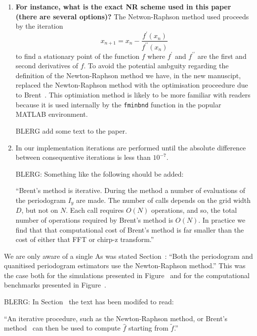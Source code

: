 \documentclass[a4paper,10pt]{article}
\begin{document}
\begin{enumerate}
\begin{enumerate}
\item \textbf{For instance, what is the exact NR scheme used in this paper (there are several options)?}  The Netwon-Raphson method used proceeds by the iteration
\[
x_{n+1} = x_n - \frac{f^\prime(x_{n})}{f^{\prime\prime}(x_n)}
\]
to find a stationary point of the function $f$ where $f^\prime$ and $f^{\prime\prime}$ are the first and second derivatives of $f$.  To avoid the potential ambguity regarding the definition of the Newton-Raphson method we have, in the new manuscipt, replaced the Newton-Raphson method with the optimisation proceedure due to Brent~\cite[Ch.~5]{Brent_opt_no_derivs_1973}.  This optimiation method is likely to be more familiar with readers because it is used internally by the \texttt{fminbnd} function in the popular MATLAB environment. 

BLERG add some text to the paper.

\item {} In our implementation iterations are performed until the absolute difference between consequentive iterations is less than $10^{-7}$.

BLERG: Something like the following should be added:

``Brent's method is iterative.  During the method a number of evaluations of the periodogram $I_y$ are made.  The number of calls depends on the grid width $D$, but not on $N$.  Each call requires $O(N)$ operations, and so, the total number of operations required by Brent's method is $O(N)$. In practice we find that that computational cost of Brent's method is far smaller than the cost of either that FFT or chirp-z transform.''

\end{enumerate}

We are only aware of a single   As was stated Section~: ``Both the periodogram and quanitised periodogram estimators use the Newton-Raphson method.''  This was the case both for the simulations presented in Figure~ and for the computational benchmarks presented in Figure~.


BLERG: In Section~ the text has been modifed to read:

``An iterative procedure, such as the Newton-Raphson method, or Brent's method~\cite{Brent_opt_no_derivs_1973} 
can then be used to compute $\hat{f}$ starting from $\widetilde{f}$.''




\end{enumerate}
\end{document}
